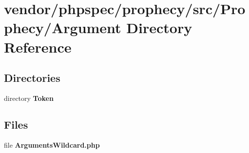 \section{vendor/phpspec/prophecy/src/\+Prophecy/\+Argument Directory Reference}
\label{dir_b284ec374a3017886b489e3de7bc2582}
\subsection*{Directories}
\begin{DoxyCompactItemize}
\item 
directory {\bf Token}
\end{DoxyCompactItemize}
\subsection*{Files}
\begin{DoxyCompactItemize}
\item 
file {\bf Arguments\+Wildcard.\+php}
\end{DoxyCompactItemize}
